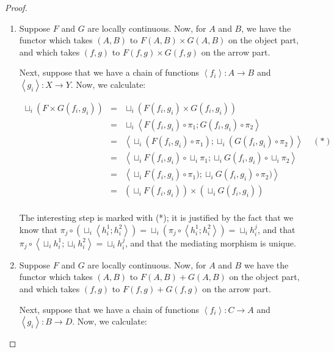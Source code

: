 \begin{proof}

\begin{enumerate}
\item Suppose $F$ and $G$ are locally continuous. Now, for $A$ and $B$, we have 
the functor which takes $(A,B)$ to $F(A,B) \times G(A,B)$
on the object part, and which takes $(f,g)$ to $F(f,g) \times G(f,g)$ on
the arrow part.

Next, suppose that we have a chain of functions $\left<f_i\right> : A \to B$ and
$\left<g_i\right> : X \to Y$. Now, we calculate:

\begin{displaymath}
\begin{array}{lcl}
  \sqcup_i (F \times G (f_i,g_i)) 
   & = & \sqcup_i (F(f_i,g_i) \times G(f_i,g_i)) \\
   & = & \sqcup_i \left<F(f_i,g_i) \circ \pi_1; 
                        G(f_i,g_i) \circ \pi_2\right>\\
   & = & \left<\sqcup_i (F(f_i,g_i) \circ \pi_1);
               \sqcup_i (G(f_i,g_i) \circ \pi_2)\right> \;\;\;\;(*)\\
   & = & \left<\sqcup_i F(f_i,g_i) \circ \sqcup_i \pi_1;
               \sqcup_i G(f_i,g_i) \circ \sqcup_i \pi_2\right>\\
   & = & \left<\sqcup_i F(f_i,g_i) \circ \pi_1);
               \sqcup_i G(f_i,g_i) \circ \pi_2)\right>\\
   & = & (\sqcup_i F(f_i,g_i)) \times (\sqcup_i G(f_i,g_i))\\
\end{array}
\end{displaymath}

The interesting step is marked with (*); it is justified by the fact
that we know that $\pi_j \circ (\sqcup_i \left<h^1_i;h^2_i\right>) = 
\sqcup_i (\pi_j \circ \left<h^1_i;h^2_i\right>) = 
\sqcup_i h^j_i$,
and that $\pi_j \circ \left<\sqcup_i h^1_i; \sqcup_i h^2_i\right> = \sqcup_i h^j_i$,
and that the mediating morphism is unique. 


\item Suppose $F$ and $G$ are locally continuous. Now, for $A$ and $B$
we have the functor which takes $(A,B)$ to $F(A,B) + G(A,B)$
on the object part, and which takes $(f,g)$ to $F(f,g) + G(f,g)$ on
the arrow part.

Next, suppose that we have a chain of functions $\left<f_i\right> : C \to A$ and
$\left<g_i\right> : B \to D$. Now, we calculate:


\end{enumerate}
\end{proof}
